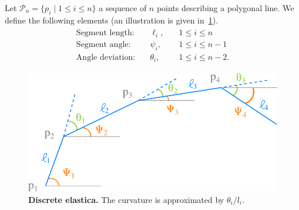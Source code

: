 Let $\mathcal{P}_n=\{p_i \; | \; 1 \leq i \leq n\}$ a sequence of $n$ points describing a polygonal line. We define the following elements (an illustration is given in~\cref{ch3:fig:bruckstein-polygonal-line}).
\begin{align*}
\begin{array}{rll}
\text{Segment length:} & \quad \ell_i,& \quad 1 \leq i \leq n\\[0.5em]
\text{Segment angle:} & \quad \psi_i,& \quad 1 \leq i \leq n-1\\[0.5em]
\text{Angle deviation:} & \quad \theta_i,& \quad 1 \leq i \leq n-2.
\end{array}
\end{align*}
%
\begin{figure}
\center
\includegraphics[scale=0.6]{figures/chapter3/bruckstein/polygonal-line.png}
\caption{\textbf{Discrete elastica.} The curvature is approximated by $\theta_i/l_i$.}
\label{ch3:fig:bruckstein-polygonal-line}
\end{figure}

